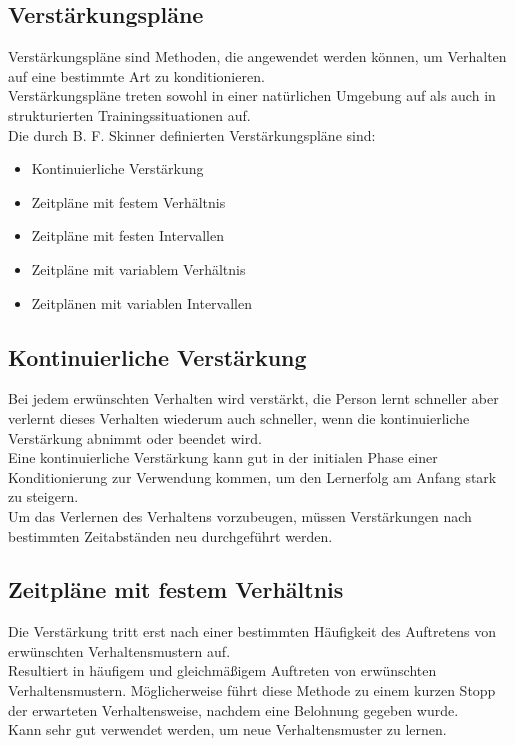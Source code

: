 		\subsection{Verstärkungspläne}
		
		Verstärkungspläne sind Methoden, die angewendet werden können, um Verhalten auf eine bestimmte Art zu konditionieren. \\ 
Verstärkungspläne treten sowohl in einer natürlichen Umgebung auf als auch in strukturierten Trainingssituationen auf. \\
Die durch B. F. Skinner definierten Verstärkungspläne sind: 

		\begin{itemize}
			\item Kontinuierliche Verstärkung
			\item Zeitpläne mit festem Verhältnis
			\item Zeitpläne mit festen Intervallen
			\item Zeitpläne mit variablem Verhältnis
			\item Zeitplänen mit variablen Intervallen
		\end{itemize}
		
		\subsection{Kontinuierliche Verstärkung}
		
		Bei jedem erwünschten Verhalten wird verstärkt, die Person lernt schneller aber verlernt dieses Verhalten wiederum auch schneller, wenn die kontinuierliche Verstärkung abnimmt oder beendet wird. \\
Eine kontinuierliche Verstärkung kann gut in der initialen Phase einer Konditionierung zur Verwendung kommen, um den Lernerfolg am Anfang stark zu steigern.\\
Um das Verlernen des Verhaltens vorzubeugen, müssen Verstärkungen nach bestimmten Zeitabständen neu durchgeführt werden. \\

		\subsection{Zeitpläne mit festem Verhältnis}
		
		Die Verstärkung tritt erst nach einer bestimmten Häufigkeit des Auftretens von erwünschten Verhaltensmustern auf.\\
Resultiert in häufigem und gleichmäßigem Auftreten von erwünschten Verhaltensmustern. Möglicherweise führt diese Methode zu einem kurzen Stopp der erwarteten Verhaltensweise, nachdem eine Belohnung gegeben wurde. \\
Kann sehr gut verwendet werden, um neue Verhaltensmuster zu lernen.\\

